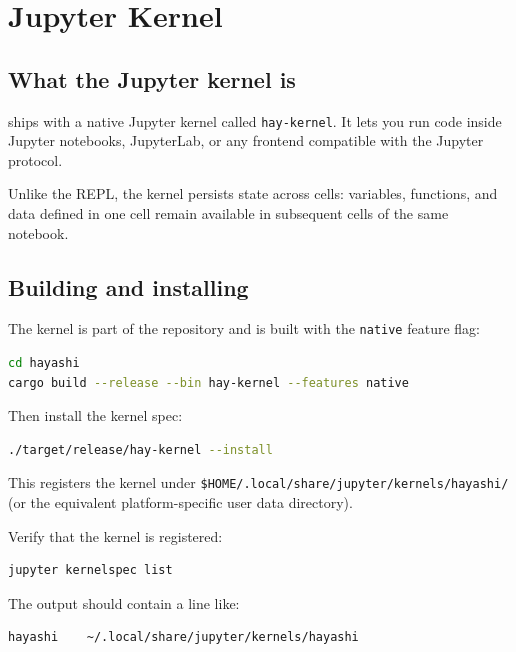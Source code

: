 \chapter{Jupyter Kernel}

\section{What the Jupyter kernel is}

\hayashi{} ships with a native Jupyter kernel called \texttt{hay-kernel}. It
lets you run \hayashi{} code inside Jupyter notebooks, JupyterLab, or any frontend
compatible with the Jupyter protocol.

Unlike the REPL, the kernel persists state across cells: variables, functions,
and data defined in one cell remain available in subsequent cells of the same
notebook.

\section{Building and installing}

The kernel is part of the \hayashi{} repository and is built with the
\texttt{native} feature flag:

\begin{lstlisting}[style=inline, language=sh]
cd hayashi
cargo build --release --bin hay-kernel --features native
\end{lstlisting}

Then install the kernel spec:

\begin{lstlisting}[style=inline, language=sh]
./target/release/hay-kernel --install
\end{lstlisting}

This registers the kernel under
\texttt{\$HOME/.local/share/jupyter/kernels/hayashi/} (or the equivalent
platform-specific user data directory).

Verify that the kernel is registered:

\begin{lstlisting}[style=inline, language=sh]
jupyter kernelspec list
\end{lstlisting}

The output should contain a line like:

\begin{lstlisting}[style=inline]
hayashi    ~/.local/share/jupyter/kernels/hayashi
\end{lstlisting}

